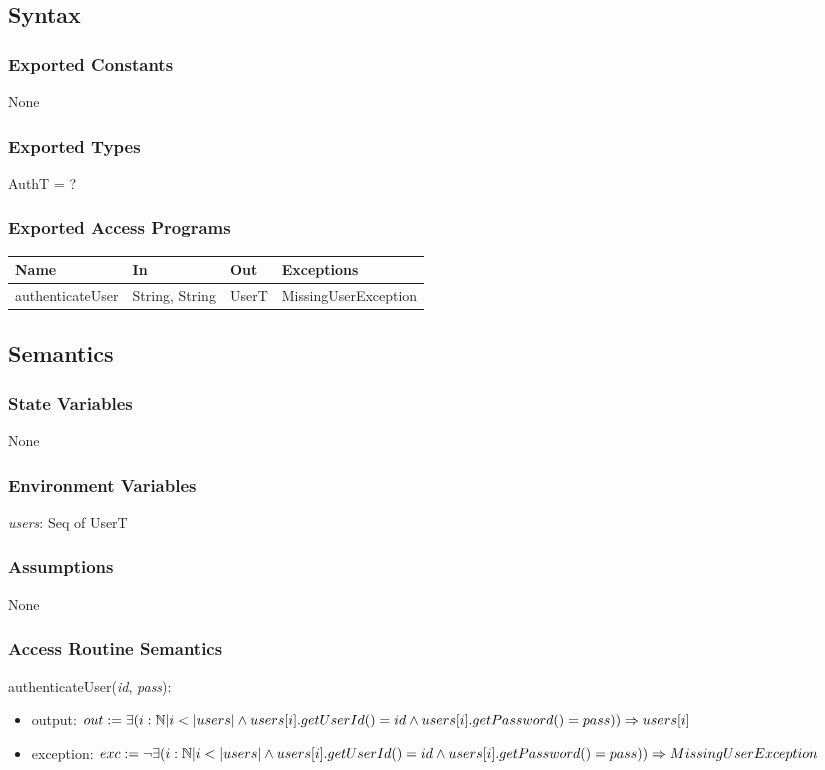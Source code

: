 \documentclass[12pt, titlepage]{article}
\begin{document}
\subsection{Syntax}

\subsubsection{Exported Constants}
None

\subsubsection{Exported Types}
AuthT = ?

\subsubsection{Exported Access Programs}

\begin{tabular}{p{4cm} p{4cm} p{2cm} p{4cm}}
\hline
\textbf{Name} & \textbf{In} & \textbf{Out} & \textbf{Exceptions} \\
\hline
authenticateUser & String, String & UserT & MissingUserException \\
\hline
\end{tabular}

\subsection{Semantics}

\subsubsection{State Variables}
None

\subsubsection{Environment Variables}
\textit{users}: Seq of UserT 

\subsubsection{Assumptions}
None

\subsubsection{Access Routine Semantics}

\noindent authenticateUser(\textit{id}, \textit{pass}):
\begin{itemize}
\item output: $out := \exists (i : \mathbb{N} | i < |users| \land
users[i].getUserId() = \\ id \land users[i].getPassword() = pass)) \Rightarrow
users[i]$

\item exception: $exc := \neg \exists (i : \mathbb{N} | i < |users| \land
users[i].getUserId() = \\ id \land users[i].getPassword() = pass)) \Rightarrow
MissingUserException$
\end{itemize}
\end{document}
